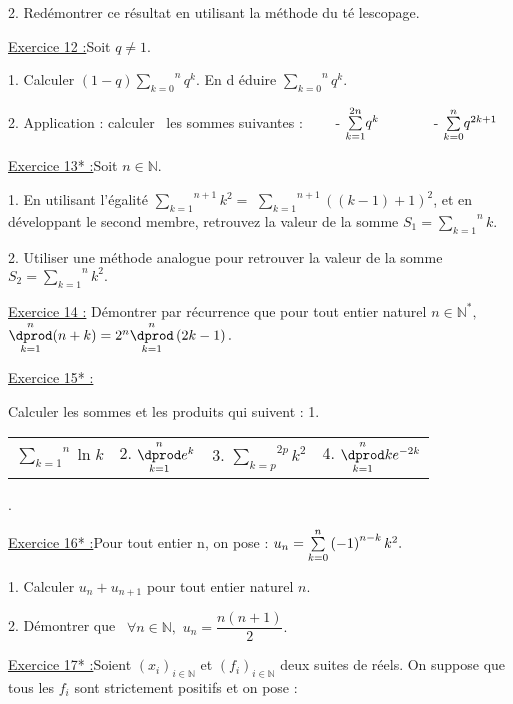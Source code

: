 \documentclass{article}
\begin{document}
2. Red\'{e}montrer ce r\'{e}sultat en utilisant la m\'{e}thode du t\'{e}%
lescopage.

\underline{Exercice 12 :}Soit $q\neq 1.$

1. Calculer $\left( 1-q\right) \overset{n}{\underset{k=0}{\sum }}q^{k}.$ En d%
\'{e}duire $\overset{n}{\underset{k=0}{\sum }}q^{k}.$

2. Application : calculer \ les sommes suivantes : \ \ \ \ - $\overset{2n}{%
\underset{k=1}{\sum }}q^{k}$ \ \ \ \ \ \ \ - $\overset{n}{\underset{k=0}{%
\sum }}q^{2k+1}$

\underline{Exercice 13* :}Soit $n\in 
\mathbb{N}
.$

1. En utilisant l'\'{e}galit\'{e} $\overset{n+1}{\underset{k=1}{\sum }}%
k^{2}= $ $\overset{n+1}{\underset{k=1}{\sum }}\left( (k-1)+1\right) ^{2}$,
et en d\'{e}veloppant le second membre, retrouvez la valeur de la somme $%
S_{1}=\overset{n}{\underset{k=1}{\sum }}k.$

2. Utiliser une m\'{e}thode analogue pour retrouver la valeur de la somme $%
S_{2}=\overset{n}{\underset{k=1}{\sum }}k^{2}.$

\underline{Exercice 14 :} D\'{e}montrer par r\'{e}currence que pour tout
entier naturel $n\in 
\mathbb{N}
^{\ast },$ $\overset{n}{\underset{k=1}{\dprod }}(n+k)=2^{n}\overset{n}{%
\underset{k=1}{\dprod }}\left( 2k-1\right) .$

\underline{Exercice 15* :}

Calculer les sommes et les produits qui suivent : 1. 
\begin{tabular}[t]{llll}
$\overset{n}{\underset{k=1}{\sum }}\ln k$ & 2. $\overset{n}{\underset{k=1}{%
\dprod }}e^{k}$ & 3. $\overset{2p}{\underset{k=p}{\sum }}k^{2}$ & 4. $%
\overset{n}{\underset{k=1}{\dprod }}ke^{-2k}$%
\end{tabular}%
.

\underline{Exercice 16* :}Pour tout entier n, on pose : $u_{n}=\overset{n}{%
\underset{k=0}{\sum }}\left( -1\right) ^{n-k}k^{2}.$

1. Calculer $u_{n}+u_{n+1}$ pour tout entier naturel $n.$

2. D\'{e}montrer que \ $\forall n\in 
\mathbb{N}
,$ $u_{n}=\dfrac{n\left( n+1\right) }{2}.$

\underline{Exercice 17* :}Soient $\left( x_{i}\right) _{i\in 
\mathbb{N}
}$ et $\left( f_{i}\right) _{i\in 
\mathbb{N}
}$ deux suites de r\'{e}els. On suppose que tous les $f_{i}$ sont
strictement positifs et on pose :
\end{document}

